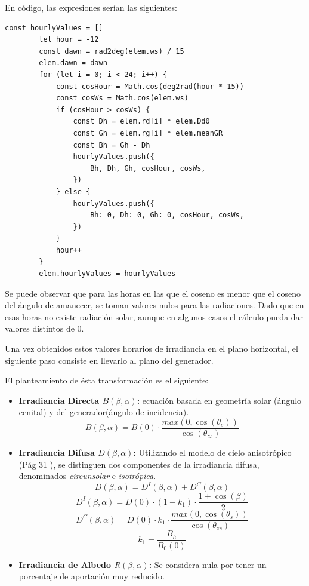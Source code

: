 En código, las expresiones serían las siguientes:

\begin{lstlisting}[style=ES6, caption={Cálculo de rG}]
		const hourlyValues = []
		let hour = -12
		const dawn = rad2deg(elem.ws) / 15
		elem.dawn = dawn
		for (let i = 0; i < 24; i++) {
			const cosHour = Math.cos(deg2rad(hour * 15))
			const cosWs = Math.cos(elem.ws)
			if (cosHour > cosWs) {
				const Dh = elem.rd[i] * elem.Dd0
				const Gh = elem.rg[i] * elem.meanGR
				const Bh = Gh - Dh
				hourlyValues.push({
					Bh, Dh, Gh, cosHour, cosWs,
				})
			} else {
				hourlyValues.push({
					Bh: 0, Dh: 0, Gh: 0, cosHour, cosWs,
				})
			}
			hour++
		}
		elem.hourlyValues = hourlyValues
\end{lstlisting}

Se puede observar que para las horas en las que el coseno es menor que el coseno del ángulo de amanecer, se toman valores nulos para las radiaciones. Dado que en esas horas no existe radiación solar, aunque en algunos casos el cálculo pueda dar valores distintos de 0.

Una vez obtenidos estos valores horarios de irradiancia en el plano horizontal, el siguiente paso consiste en llevarlo al plano del generador.

El planteamiento de ésta transformación es el siguiente:
\begin{itemize}
\item \textbf{Irradiancia Directa $B(\beta,\alpha)$:} ecuación basada en geometría solar (ángulo cenital) y del generador(ángulo de incidencia).
\begin{equation}
\label{eqn:B_beta_alpha}
B(\beta,\alpha) = B(0) \cdot \frac{max(0,\cos(\theta_s))}{\cos(\theta_{zs})}
\end{equation}
\item \textbf{Irradiancia Difusa $D(\beta,\alpha)$:} Utilizando el modelo de cielo anisotrópico (Pág 31 \cite{esf_book}), se distinguen dos componentes de la irradiancia difusa, denominados \textit{circunsolar} e \textit{isotrópica}.
\begin{equation}
D(\beta,\alpha) = D^I(\beta,\alpha)+D^C(\beta,\alpha)
\end{equation}
\begin{equation}
D^I(\beta,\alpha) = D(0)\cdot(1-k_1)\cdot\frac{1+\cos(\beta)}{2}
\end{equation}
\begin{equation}
D^C(\beta,\alpha) = D(0)\cdot k_1 \cdot \frac{max(0, \cos(\theta_s))}{\cos(\theta_{zs})}
\end{equation}
\begin{equation}
k_1 = \frac{B_h}{B_0(0)}
\end{equation}
\item \textbf{Irradiancia de Albedo $R(\beta,\alpha)$:} Se considera nula por tener un porcentaje de aportación muy reducido.
\end{itemize}

